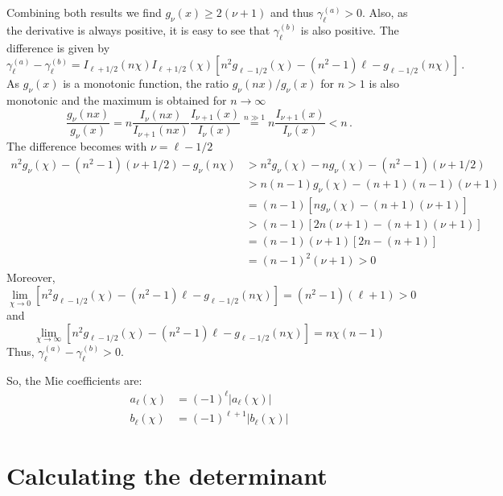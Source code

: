 \documentclass[superscriptaddress,prb]{revtex4-1}
\begin{document}
Combining both results we find $g_\nu(x) \ge 2(\nu+1)$ and thus
$\gamma_\ell^{(a)} > 0$. Also, as the derivative is always positive, it is easy
to see that $\gamma_\ell^{(b)}$ is also positive.
The difference is given by
\begin{equation}
\gamma_\ell^{(a)} - \gamma_\ell^{(b)} = I_{\ell+1/2}(n\chi) I_{\ell+1/2}(\chi) \left[ n^2 g_{\ell-1/2}(\chi) - (n^2-1)\ell - g_{\ell-1/2}(n\chi) \right] \,.
\end{equation}
As $g_\nu(x)$ is a monotonic function, the ratio $g_\nu(nx)/g_\nu(x)$ for $n>1$
is also monotonic and the maximum is obtained for $n\to\infty$
\begin{equation}
\frac{g_\nu(nx)}{g_\nu(x)} = n \frac{I_\nu(nx)}{I_{\nu+1}(nx)} \frac{I_{\nu+1}(x)}{I_\nu(x)} \overset{n\gg1}{=} n \frac{I_{\nu+1}(x)}{I_\nu(x)} < n \,.
\end{equation}
The difference becomes with $\nu=\ell-1/2$
\begin{align}
n^2 g_\nu(\chi) - (n^2-1)(\nu+1/2) - g_\nu(n\chi) &> n^2 g_\nu(\chi) -n g_\nu(\chi) - (n^2-1)(\nu+1/2) \\
&> n(n-1) g_\nu(\chi) - (n+1)(n-1)(\nu+1) \\
&= (n-1) \left[ ng_\nu(\chi) - (n+1)(\nu+1) \right] \\
&> (n-1) \left[ 2n(\nu+1) - (n+1)(\nu+1) \right] \\
&= (n-1)(\nu+1) \left[ 2n - (n+1) \right] \\
&= (n-1)^2 (\nu+1) > 0
\end{align}
Moreover,
\begin{equation}
\lim_{\chi\to0} \left[ n^2 g_{\ell-1/2}(\chi) - (n^2-1)\ell - g_{\ell-1/2}(n\chi) \right] = (n^2-1)(\ell+1) > 0
\end{equation}
and
\begin{equation}
\lim_{\chi\to\infty} \left[ n^2 g_{\ell-1/2}(\chi) - (n^2-1)\ell - g_{\ell-1/2}(n\chi) \right] = n\chi(n-1)
\end{equation}
Thus, $\gamma_\ell^{(a)}-\gamma_\ell^{(b)} > 0$.

So, the Mie coefficients are:
\begin{align}
a_\ell(\chi) &= (-1)^\ell | a_\ell(\chi) | \\
b_\ell(\chi) &= (-1)^{\ell+1} | b_\ell(\chi) |
\end{align}

\section{Calculating the determinant}
\end{document}
